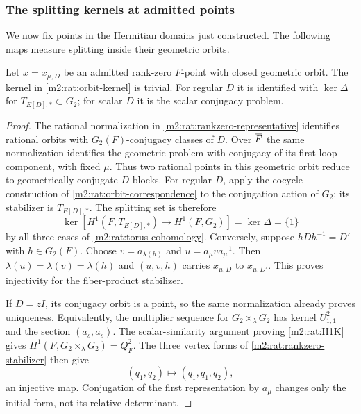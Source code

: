 \subsubsection{The splitting kernels at admitted points}

We now fix points in the Hermitian domains just constructed.
The following maps measure splitting inside their geometric orbits.

\begin{proposition}\label{m2:rat:rankzero-kernel}
Let $x=x_{\mu,D}$ be an admitted rank-zero $F$-point with closed
geometric orbit. The kernel in \eqref{m2:rat:orbit-kernel} is trivial.
For regular $D$ it is identified with $\ker\Delta$ for
$T_{E[D],*}\subset G_2$; for scalar $D$ it is the scalar
conjugacy problem.
\end{proposition}

\begin{proof}
The rational normalization in \eqref{m2:rat:rankzero-representative}
identifies rational orbits with $G_2(F)$-conjugacy classes of $D$.
Over $\overline F$ the same normalization identifies the geometric
problem with conjugacy of its first loop component, with fixed
$\mu$. Thus two rational points in this geometric orbit reduce
to geometrically conjugate $D$-blocks. For regular $D$, apply
the cocycle construction of \cref{m2:rat:orbit-correspondence} to
the conjugation action of $G_2$; its stabilizer is $T_{E[D],*}$.
The splitting set is therefore
\begin{equation}\label{m2:rat:rankzero-regular-kernel}
 \ker[H^1(F,T_{E[D],*})\longrightarrow H^1(F,G_2)]
 =\ker\Delta=\{1\}
\end{equation}
by all three cases of \cref{m2:rat:torus-cohomology}.
Conversely, suppose
$hDh^{-1}=D'$ with $h\in G_2(F)$. Choose
$v=a_{\lambda(h)}$ and $u=a_\mu v a_\mu^{-1}$. Then
$\lambda(u)=\lambda(v)=\lambda(h)$ and
$(u,v,h)$ carries $x_{\mu,D}$ to $x_{\mu,D'}$.
This proves injectivity for the fiber-product stabilizer.

If $D=zI$, its conjugacy orbit is a point, so the same normalization
already proves uniqueness. Equivalently, the multiplier sequence
for $G_2\times_\lambda G_2$ has kernel $U_{1,1}^2$ and the
section $(a_s,a_s)$. The scalar-similarity argument proving
\eqref{m2:rat:H1K} gives $H^1(F,G_2\times_\lambda G_2)=Q_F^2$.
The three vertex forms of \eqref{m2:rat:rankzero-stabilizer} then give
\begin{equation}\label{m2:rat:rankzero-scalar-H1}
 (q_1,q_2)\longmapsto(q_1,q_1,q_2),
\end{equation}
an injective map. Conjugation of the first representation by
$a_\mu$ changes only the initial form, not its relative determinant.
\end{proof}

